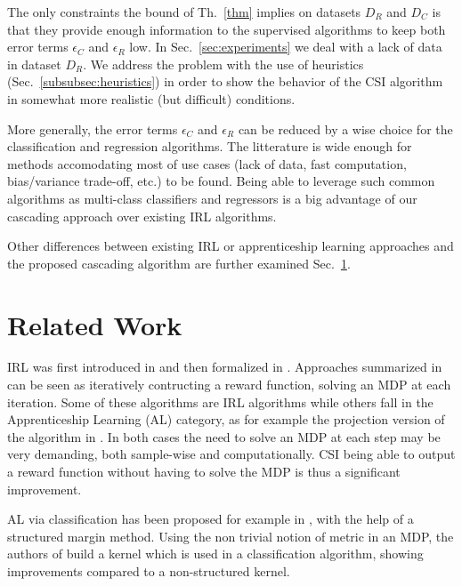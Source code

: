 \documentclass{llncs}
\begin{document}
The only constraints the bound of Th.~\ref{thm} implies on datasets $D_R$ and $D_C$ is that they provide enough information to the supervised algorithms to keep both error terms $\epsilon_C$ and $\epsilon_R$ low. In Sec.~\ref{sec:experiments} we deal with a lack of data in dataset $D_R$. We address the problem with the use of heuristics (Sec.~\ref{subsubsec:heuristics}) in order to show the behavior of the CSI algorithm in somewhat more realistic (but difficult) conditions.

More generally, the error terms  $\epsilon_C$ and $\epsilon_R$ can be reduced by a wise choice for the classification and regression algorithms. The litterature is wide enough for methods accomodating most of use cases (lack of data, fast computation, bias/variance trade-off, etc.) to be found. Being able to leverage such common algorithms as multi-class classifiers and regressors is a big advantage of our cascading approach over existing IRL algorithms.

Other differences between existing IRL or apprenticeship learning approaches and the proposed cascading algorithm are further examined Sec.~\ref{sec:related}.


\section{Related Work}
\label{sec:related}
IRL was first introduced in \cite{russell1998learning} and then formalized in \cite{ng2000algorithms}. Approaches summarized in \cite{neu2009training} can be seen as iteratively contructing a reward function, solving an MDP at each iteration. Some of these algorithms are IRL algorithms while others fall in the Apprenticeship Learning (AL) category, as for example the projection version of the algorithm in \cite{abbeel2004apprenticeship}. In both cases the need to solve an MDP at each step may be very demanding, both sample-wise and computationally. CSI being able to output a reward function without having to solve the MDP is thus a significant improvement.

AL via classification has been proposed for example in \cite{ratliff2007imitation}, with the help of a structured margin method. Using the non trivial notion of metric in an MDP, the authors of \cite{melo2010learning} build a kernel which is used
in a classification algorithm, showing improvements compared to a
non-structured kernel.
\end{document}
